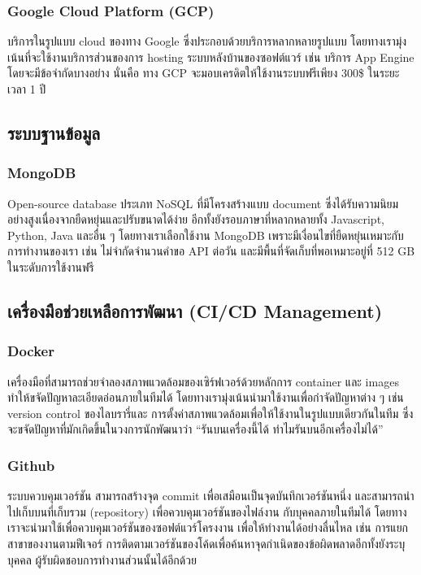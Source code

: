 \subsubsection{Google Cloud Platform (GCP)}
บริการในรูปแบบ cloud ของทาง Google ซึ่งประกอบด้วยบริการหลากหลายรูปแบบ 
โดยทางเรามุ่งเน้นที่จะใช้งานบริการส่วนของการ hosting ระบบหลังบ้านของซอฟต์แวร์ 
เช่น บริการ App Engine โดยจะมีข้อจำกัดบางอย่าง นั่นคือ ทาง GCP 
จะมอบเครดิตให้ใช้งานระบบฟรีเพียง 300\$ ในระยะเวลา 1 ปี

\subsection{ระบบฐานข้อมูล}
\subsubsection{MongoDB}
Open-source database ประเภท NoSQL ที่มีโครงสร้างแบบ document 
ซึ่งได้รับความนิยมอย่างสูงเนื่องจากยืดหยุ่นและปรับขนาดได้ง่าย 
อีกทั้งยังรอบภาษาที่หลากหลายทั้ง Javascript, Python, Java และอื่น ๆ 
โดยทางเราเลือกใช้งาน MongoDB เพราะมีเงื่อนไขที่ยืดหยุ่นเหมาะกับการทำงานของเรา 
เช่น ไม่จำกัดจำนวนคำขอ API ต่อวัน และมีพื้นที่จัดเก็บที่พอเหมาะอยู่ที่ 512 GB 
ในระดับการใช้งานฟรี

\subsection{เครื่องมือช่วยเหลือการพัฒนา (CI/CD Management)}
\subsubsection{Docker}
เครื่องมือที่สามารถช่วยจำลองสภาพแวดล้อมของเซิร์ฟเวอร์ด้วยหลักการ container 
และ images ทำให้ขจัดปัญหาละเอียดอ่อนภายในทีมได้ 
โดยทางเรามุ่งเน้นนำมาใช้งานเพื่อกำจัดปัญหาต่าง ๆ เช่น version control 
ของไลบรารี่และ การตั้งค่าสภาพแวดล้อมเพื่อให้ใช้งานในรูปแบบเดียวกันในทีม 
ซึ่งจะขจัดปัญหาที่มักเกิดขึ้นในวงการนักพัฒนาว่า “รันบนเครื่องนี้ได้ 
ทำไมรันบนอีกเครื่องไม่ได้”
\subsubsection{Github}
ระบบควบคุมเวอร์ชัน สามารถสร้างจุด commit เพื่อเสมือนเป็นจุดบันทึกเวอร์ชันหนึ่ง 
และสามารถนำไปเก็บบนที่เก็บรวม (repository) เพื่อควบคุมเวอร์ชันของไฟล์งาน
กับบุคคลภายในทีมได้ โดยทางเราจะนำมาใช้เพื่อควบคุมเวอร์ชันของซอฟต์แวร์โครงงาน 
เพื่อให้ทำงานได้อย่างลื่นไหล เช่น การแยกสาขาของงานตามฟีเจอร์ 
การติดตามเวอร์ชันของโค้ดเพื่อค้นหาจุดกำเนิดของข้อผิดพลาดอีกทั้งยังระบุบุคคล
ผู้รับผิดชอบการทำงานส่วนนั้นได้อีกด้วย

